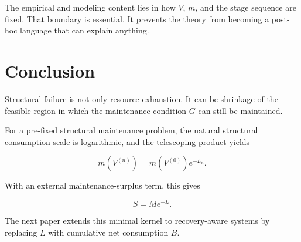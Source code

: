 \documentclass[12pt,a4paper]{article}
\begin{document}
The empirical and modeling content lies in how \(V\), \(m\), and the stage sequence are fixed. That boundary is essential. It prevents the theory from becoming a post-hoc language that can explain anything.

\section{Conclusion}\label{conclusion}

Structural failure is not only resource exhaustion. It can be shrinkage of the feasible region in which the maintenance condition \(G\) can still be maintained.

For a pre-fixed structural maintenance problem, the natural structural consumption scale is logarithmic, and the telescoping product yields

\[
m(V^{(n)})=m(V^{(0)})e^{-L_{n}}.
\]

With an external maintenance-surplus term, this gives

\[
S=Me^{-L}.
\]

The next paper extends this minimal kernel to recovery-aware systems by replacing \(L\) with cumulative net consumption \(B\).
\end{document}
